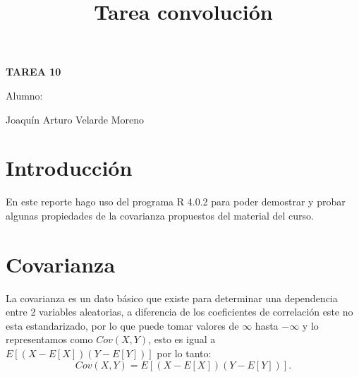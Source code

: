 \documentclass[]{article}
\title{Tarea convolución}
\date{}
\begin{document}
	\maketitle
	\begin{center}


\centerline{\textbf{TAREA 10} } 
\textbf{ }

\centerline{Alumno: } 
\centerline{Joaquín Arturo Velarde Moreno}


	\end{center}
	

\section{Introducción}
En este reporte hago uso del programa R 4.0.2 \cite{rproject} para poder demostrar y probar algunas propiedades de la covarianza propuestos del material del curso\cite{MaterialClase}.


\section{Covarianza}

La covarianza es un dato básico que existe para determinar una dependencia entre 2 variables aleatorias, a diferencia de los coeficientes de correlación este no esta estandarizado, por lo que puede tomar valores de $\infty$ hasta $-\infty$ y lo representamos como $Cov(X,Y)$, esto es igual a $E[(X - E[X])(Y - E[Y])]$ por lo tanto:
\[Cov(X,Y) = E[(X - E[X])(Y - E[Y])]. \]
\end{document}
